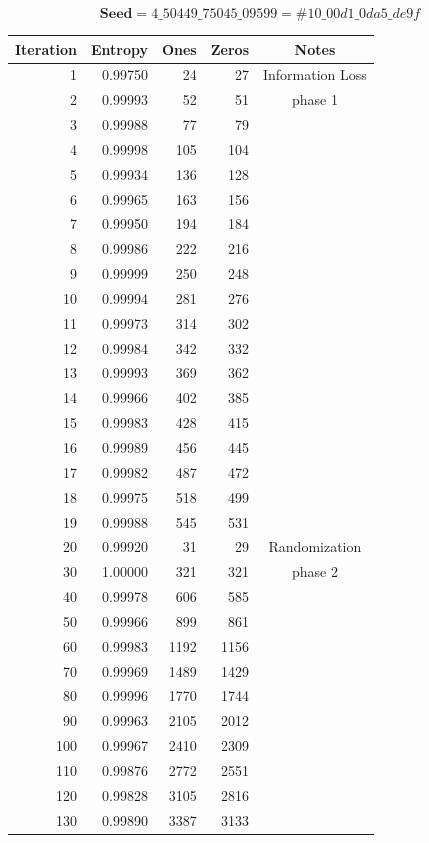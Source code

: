 \documentclass[letterpaper]{article}
\begin{document}
\begin{multicols}{2}
\begin{center}
$$\textbf{Seed} = 4\_50449\_75045\_09599 = \#10\_00d1\_0da5\_de9f$$
\begin{tabular}{|r|r|r|r|c|}
\hline
\textbf{Iteration} & \textbf{Entropy} & \textbf{Ones} & \textbf{Zeros} & \textbf{Notes}\\
\hline
1 & 0.99750 & 24 & 27 & Information Loss \\
2 & 0.99993 & 52 & 51 & phase 1\\
3 & 0.99988 & 77 & 79 & \\
4 & 0.99998 & 105 & 104 & \\
5 & 0.99934 & 136 & 128 & \\
6 & 0.99965 & 163 & 156 & \\
7 & 0.99950 & 194 & 184 & \\
8 & 0.99986 & 222 & 216 & \\
9 & 0.99999 & 250 & 248 & \\
10 & 0.99994 & 281 & 276 & \\
11 & 0.99973 & 314 & 302 & \\
12 & 0.99984 & 342 & 332 & \\
13 & 0.99993 & 369 & 362 & \\
14 & 0.99966 & 402 & 385 & \\
15 & 0.99983 & 428 & 415 & \\
16 & 0.99989 & 456 & 445 & \\
17 & 0.99982 & 487 & 472 & \\
18 & 0.99975 & 518 & 499 & \\
19 & 0.99988 & 545 & 531 & \\
\hline
20 & 0.99920 & 31 & 29  & Randomization\\
30 & 1.00000 & 321 & 321 &  phase 2 \\
40 & 0.99978 & 606 & 585 & \\
50 & 0.99966 & 899 & 861 & \\
60 & 0.99983 & 1192 & 1156 & \\
70 & 0.99969 & 1489 & 1429 & \\
80 & 0.99996 & 1770 & 1744 & \\
90 & 0.99963 & 2105 & 2012 & \\
100 & 0.99967 & 2410 & 2309 & \\
110 & 0.99876 & 2772 & 2551 & \\
120 & 0.99828 & 3105 & 2816 & \\
130 & 0.99890 & 3387 & 3133 & \\
\hline
\end{tabular}
\end{center}


\end{multicols}
\end{document}
